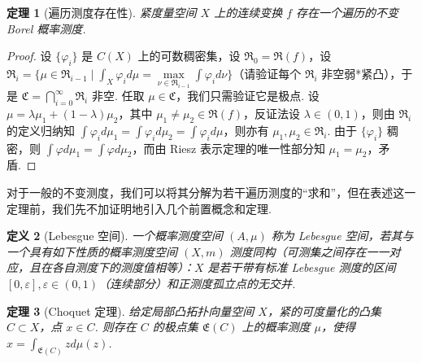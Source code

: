 \documentclass[11pt, a4paper, oneside]{ctexart}
\newtheorem{theorem}{定理}[section]
\newtheorem{definition}[theorem]{定义}
\newcommand{\fC}{\mathfrak{C}}
\newcommand{\fE}{\mathfrak{E}}
\newcommand{\fR}{\mathfrak{R}}
\begin{document}
    \begin{theorem}[遍历测度存在性]
        紧度量空间 $X$ 上的连续变换 $f$ 存在一个遍历的不变 Borel 概率测度.
    \end{theorem}
    \begin{proof}
        设 $\{\varphi_i\}$ 是 $C(X)$ 上的可数稠密集，设 $\fR_0=\fR(f)$，设 $\fR_i=\{\mu\in\fR_{i-1}\mid \int_{X}\varphi_i d\mu=\max\limits_{\nu\in\fR_{i-1}}\int\varphi_i d\nu\}$（请验证每个 $\fR_i$ 非空弱*紧凸），于是 $\fC=\bigcap\limits_{i=0}^{\infty}\fR_i$ 非空. 任取 $\mu\in\fC$，我们只需验证它是极点. 设 $\mu=\lambda\mu_1+(1-\lambda)\mu_2$，其中 $\mu_1\neq \mu_2\in\fR(f)$，反证法设 $\lambda\in (0,1)$，则由 $\fR_i$ 的定义归纳知 $\int \varphi_i d\mu_1=\int\varphi_i d\mu_2=\int\varphi_i d\mu$，则亦有 $\mu_1,\mu_2\in \fR_i$. 由于 $\{\varphi_i\}$ 稠密，则 $\int\varphi d\mu_1=\int\varphi d\mu_2$，而由 Riesz 表示定理的唯一性部分知 $\mu_1=\mu_2$，矛盾.
    \end{proof}

    对于一般的不变测度，我们可以将其分解为若干遍历测度的“求和”，但在表述这一定理前，我们先不加证明地引入几个前置概念和定理.
    \begin{definition}[Lebesgue 空间]
        一个概率测度空间 $(A,\mu)$ 称为 Lebesgue 空间，若其与一个具有如下性质的概率测度空间 $(X,m)$ 测度同构（可测集之间存在一一对应，且在各自测度下的测度值相等）：$X$ 是若干带有标准 Lebesgue 测度的区间 $[0,\varepsilon],\varepsilon\in (0,1)$（连续部分）和正测度孤立点的无交并.
    \end{definition}

    \begin{theorem}[Choquet 定理]
        给定局部凸拓扑向量空间 $X$，紧的可度量化的凸集 $C\subset X$，点 $x\in C$. 则存在 $C$ 的极点集 $\fE(C)$ 上的概率测度 $\mu$，使得 $x=\int_{\fE(C)} zd\mu(z)$.
    \end{theorem}
\end{document}
